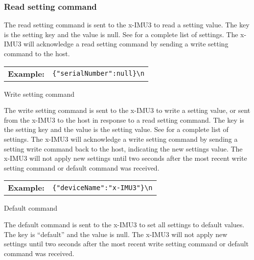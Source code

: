 \newcommand{\commandMessageExample}[2]{
    \begin{table}[H]
        \def\arraystretch{1.5}
        \begin{tabular}{l l}
            \textbf{Example:} & \texttt{\{#1\}\textbackslash n}
        \end{tabular}
    \end{table}
}

\subsubsection{Read setting command}

The read setting command is sent to the x-IMU3 to read a setting value.  The key is the setting key and the value is null.  See  for a complete list of settings.  The x-IMU3 will acknowledge a read setting command by sending a write setting command to the host.

\commandMessageExample{"serialNumber":null}

\subsubsection{Write setting command}

The write setting command is sent to the x-IMU3 to write a setting value, or sent from the x-IMU3 to the host in response to a read setting command.  The key is the setting key and the value is the setting value.  See  for a complete list of settings.  The x-IMU3 will acknowledge a write setting command by sending a setting write command back to the host, indicating the new settings value.  The x-IMU3 will not apply new settings until two seconds after the most recent write setting command or default command was received.

\commandMessageExample{"deviceName":"x-IMU3"}

\subsubsection{Default command}

The default command is sent to the x-IMU3 to set all settings to default values.  The key is \enquote{default} and the value is null.  The x-IMU3 will not apply new settings until two seconds after the most recent write setting command or default command was received.


